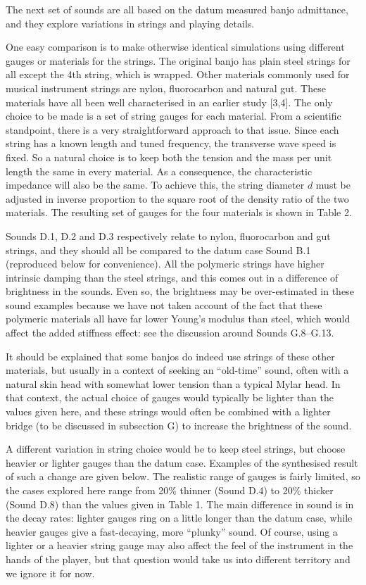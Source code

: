   The next set of sounds are all based on the datum measured banjo admittance, 
  and they explore variations in strings and playing details. 

  One easy comparison is to make otherwise identical simulations using 
  different gauges or materials for the strings. The original banjo has plain 
  steel strings for all except the 4th string, which is wrapped. Other 
  materials commonly used for musical instrument strings are nylon, 
  fluorocarbon and natural gut. These materials have all been well 
  characterised in an earlier study [3,4]. The only choice to be made is a set 
  of string gauges for each material. From a scientific standpoint, there is a 
  very straightforward approach to that issue. Since each string has a known 
  length and tuned frequency, the transverse wave speed is fixed. So a natural 
  choice is to keep both the tension and the mass per unit length the same in 
  every material. As a consequence, the characteristic impedance will also be 
  the same. To achieve this, the string diameter $d$ must be adjusted in 
  inverse proportion to the square root of the density ratio of the two 
  materials. The resulting set of gauges for the four materials is shown in 
  Table 2. 

  Sounds D.1, D.2 and D.3 respectively relate to nylon, fluorocarbon and gut 
  strings, and they should all be compared to the datum case Sound B.1 
  (reproduced below for convenience). All the polymeric strings have higher 
  intrinsic damping than the steel strings, and this comes out in a difference 
  of brightness in the sounds. Even so, the brightness may be over-estimated in 
  these sound examples because we have not taken account of the fact that these 
  polymeric materials all have far lower Young's modulus than steel, which 
  would affect the added stiffness effect: see the discussion around Sounds 
  G.8--G.13. 

  It should be explained that some banjos do indeed use strings of these other 
  materials, but usually in a context of seeking an ``old-time'' sound, often 
  with a natural skin head with somewhat lower tension than a typical Mylar 
  head. In that context, the actual choice of gauges would typically be lighter 
  than the values given here, and these strings would often be combined with a 
  lighter bridge (to be discussed in subsection G) to increase the brightness 
  of the sound. 

  A different variation in string choice would be to keep steel strings, but 
  choose heavier or lighter gauges than the datum case. Examples of the 
  synthesised result of such a change are given below. The realistic range of 
  gauges is fairly limited, so the cases explored here range from 20\% thinner 
  (Sound D.4) to 20\% thicker (Sound D.8) than the values given in Table 1. The 
  main difference in sound is in the decay rates: lighter gauges ring on a 
  little longer than the datum case, while heavier gauges give a fast-decaying, 
  more ``plunky'' sound. Of course, using a lighter or a heavier string gauge 
  may also affect the feel of the instrument in the hands of the player, but 
  that question would take us into different territory and we ignore it for 
  now. 

